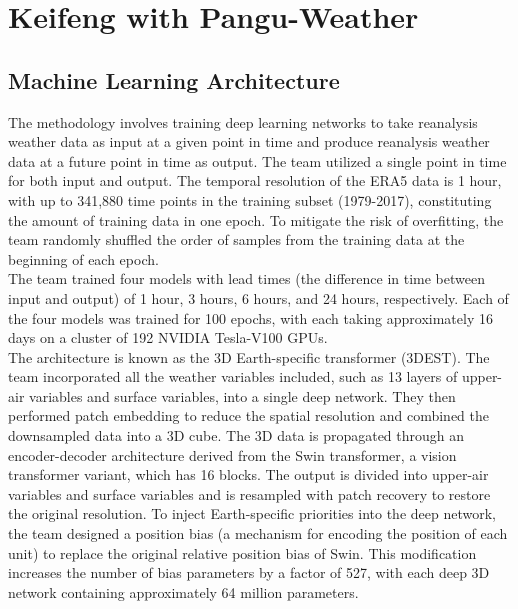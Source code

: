 \section{Keifeng with Pangu-Weather}

\subsection{Machine Learning Architecture}

The methodology involves training deep learning networks to take reanalysis weather data as input at a given point in time and produce reanalysis weather data at a future point in time as output. The team utilized a single point in time for both input and output. The temporal resolution of the ERA5 data is 1 hour, with up to 341,880 time points in the training subset (1979-2017), constituting the amount of training data in one epoch. To mitigate the risk of overfitting, the team randomly shuffled the order of samples from the training data at the beginning of each epoch.\\

The team trained four models with lead times (the difference in time between input and output) of 1 hour, 3 hours, 6 hours, and 24 hours, respectively. Each of the four models was trained for 100 epochs, with each taking approximately 16 days on a cluster of 192 NVIDIA Tesla-V100 GPUs.\\

The architecture is known as the 3D Earth-specific transformer (3DEST). The team incorporated all the weather variables included, such as 13 layers of upper-air variables and surface variables, into a single deep network. They then performed patch embedding to reduce the spatial resolution and combined the downsampled data into a 3D cube. The 3D data is propagated through an encoder-decoder architecture derived from the Swin transformer, a vision transformer variant, which has 16 blocks. The output is divided into upper-air variables and surface variables and is resampled with patch recovery to restore the original resolution. To inject Earth-specific priorities into the deep network, the team designed a position bias (a mechanism for encoding the position of each unit) to replace the original relative position bias of Swin. This modification increases the number of bias parameters by a factor of 527, with each deep 3D network containing approximately 64 million parameters.\\

